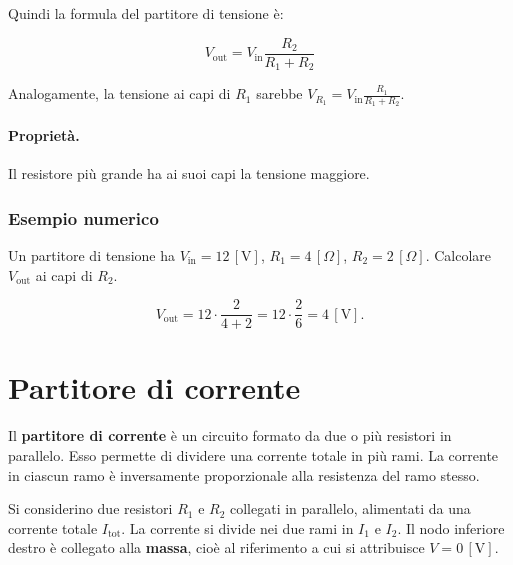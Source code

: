 Quindi la formula del partitore di tensione è:

\[
\boxed{
V_{\text{out}} = V_{\text{in}} \frac{R_2}{R_1 + R_2}
}
\]

Analogamente, la tensione ai capi di \(R_1\) sarebbe \(V_{R_1} = V_{\text{in}} \frac{R_1}{R_1 + R_2}\).

\paragraph{Proprietà.}
Il resistore più grande ha ai suoi capi la tensione maggiore.
\subsubsection{Esempio numerico}

Un partitore di tensione ha \(V_{\text{in}} = 12\,[\text{V}]\), \(R_1 = 4\,[\Omega]\), \(R_2 = 2\,[\Omega]\). Calcolare \(V_{\text{out}}\) ai capi di \(R_2\).

\[
V_{\text{out}} = 12 \cdot \frac{2}{4+2} = 12 \cdot \frac{2}{6} = 4\,[\text{V}].
\]

\section{Partitore di corrente}

\begin{concetto}
Il \textbf{partitore di corrente} è un circuito formato da due o più resistori in parallelo. Esso permette di dividere una corrente totale in più rami. La corrente in ciascun ramo è inversamente proporzionale alla resistenza del ramo stesso.
\end{concetto}


Si considerino due resistori \(R_1\) e \(R_2\) collegati in parallelo, alimentati da una corrente totale \(I_{\text{tot}}\). La corrente si divide nei due rami in \(I_1\) e \(I_2\). Il nodo inferiore destro è collegato alla \textbf{massa}, cioè al riferimento a cui si attribuisce \(V = 0\,[\text{V}]\).

